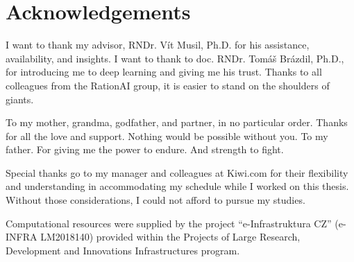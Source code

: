 \chapter*{Acknowledgements}

I want to thank my advisor, RNDr. Vít Musil, Ph.D. for his assistance, availability, and insights.
I want to thank to doc. RNDr. Tomáš Brázdil, Ph.D., for introducing me to deep learning and giving me his trust.
Thanks to all colleagues from the RationAI group, it is easier to stand on the shoulders of giants.

To my mother, grandma, godfather, and partner, in no particular order.
Thanks for all the love and support.
Nothing would be possible without you.
To my father.
For giving me the power to endure.
And strength to fight.

Special thanks go to my manager and colleagues at Kiwi.com for their flexibility and understanding in accommodating my schedule while I worked on this thesis.
Without those considerations, I could not afford to pursue my studies.

Computational resources were supplied by the project ``e-Infrastruktura CZ'' (e-INFRA LM2018140) provided within the Projects of Large Research, Development and Innovations Infrastructures program.
